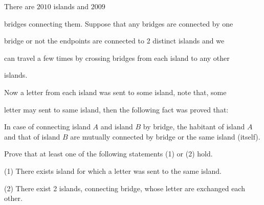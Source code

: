 There are $2010$ islands and $2009$

 bridges connecting them. Suppose that any bridges are connected by one 

bridge or not the endpoints are connected to 2 distinct islands and we 

can travel a few times by crossing bridges from each island to any other

 islands.

Now a letter from each island was sent to some island, note that, some 

letter may sent to same island, then the following fact was proved that:

In case of connecting island $A$ and island $B$ by bridge, the habitant of island $A$ and that of island $B$ are mutually connected by bridge or the same island (itself).

Prove that at least one of the following statements (1) or (2) hold.

(1) There exists island for which a letter was sent to the same island.

(2) There exist 2 islands, connecting bridge, whose letter are exchanged each other.